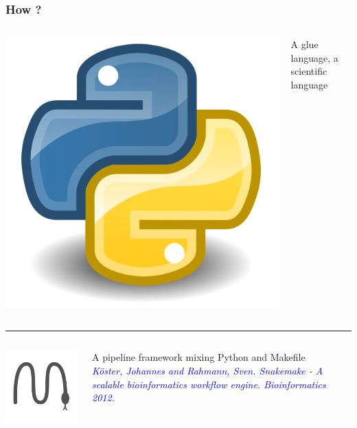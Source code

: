 \documentclass{beamer}
\begin{document}
\begin{frame}
  \frametitle{How ?}
  
  \begin{columns}
    \begin{column}{1.5cm}
      \includegraphics[height=0.2\textheight]{images/logo_python.png} 
    \end{column}
    \begin{column}{9cm}
      A glue language, a scientific language
    \end{column}
  \end{columns}
  
  \rule{\textwidth}{1pt}
  
  \begin{columns}
    \begin{column}{1.5cm}
      \includegraphics[height=0.2\textheight]{images/logo_snakemake.png}
    \end{column}
    \begin{column}{9cm}
      A pipeline framework mixing Python and Makefile \\
      {\footnotesize \textcolor{blue}{\textit{Köster, Johannes and Rahmann, Sven. 
      Snakemake - A scalable bioinformatics workflow engine. Bioinformatics 2012.}}}
    \end{column}
  \end{columns}
  

\end{frame}
\end{document}
